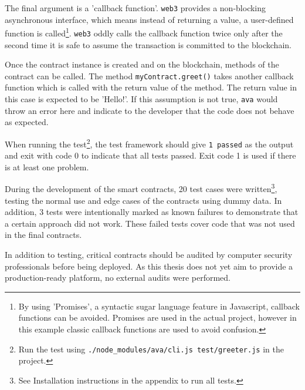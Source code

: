 The final argument is a 'callback function'. \texttt{web3} provides a non-blocking asynchronous interface, which means instead of returning a value, a user-defined function is called\footnote{By using 'Promises', a syntactic sugar language feature in Javascript, callback functions can be avoided. Promises are used in  the actual project, however in this example classic callback functions are used to avoid confusion.}.
\texttt{web3} oddly calls the callback function twice \textendash{} only after the second time it is safe to assume the transaction is committed to the blockchain.

Once the contract instance is created and on the blockchain, methods of the contract can be called. The method \texttt{myContract.greet()} takes another callback function which is called with the return value of the method. The return value in this case is expected to be 'Hello!'. If this assumption is not true, \texttt{ava} would throw an error here and indicate to the developer that the code does not behave as expected.

When running the test\footnote{Run the test using \texttt{./node\_modules/ava/cli.js test/greeter.js} in the project.}, the test framework should give \texttt{1 passed} as the output and exit with code 0 to indicate that all tests passed. Exit code 1 is used if there is at least one problem.

During the development of the smart contracts, 20 test cases were written\footnote{See Installation instructions in the appendix to run all tests.}, testing the normal use and edge cases of the contracts using dummy data. In addition, 3 tests were intentionally marked as known failures to demonstrate that a certain approach did not work. These failed tests cover code that was not used in the final contracts.

In addition to testing, critical contracts should be audited by computer security professionals before being deployed. As this thesis does not yet aim to provide a production-ready platform, no external audits were performed.
